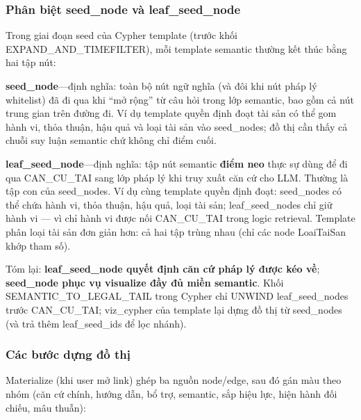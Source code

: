 \documentclass[../DoAn.tex]{subfiles}
\begin{document}
\subsubsection{Phân biệt seed\_node và leaf\_seed\_node}

Trong giai đoạn seed của Cypher template (trước khối EXPAND\_AND\_TIMEFILTER), mỗi template semantic thường kết thúc bằng hai tập nút:

\textbf{seed\_node}---định nghĩa: toàn bộ nút ngữ nghĩa (và đôi khi nút pháp lý whitelist) đã đi qua khi ``mở rộng'' từ câu hỏi trong lớp semantic, bao gồm cả nút trung gian trên đường đi. Ví dụ template quyền định đoạt tài sản có thể gom hành vi, thỏa thuận, hậu quả và loại tài sản vào seed\_nodes; đồ thị cần thấy cả chuỗi suy luận semantic chứ không chỉ điểm cuối.

\textbf{leaf\_seed\_node}---định nghĩa: tập nút semantic \textbf{điểm neo} thực sự dùng để đi qua CAN\_CU\_TAI sang lớp pháp lý khi truy xuất căn cứ cho LLM. Thường là tập con của seed\_nodes. Ví dụ cùng template quyền định đoạt: seed\_nodes có thể chứa hành vi, thỏa thuận, hậu quả, loại tài sản; leaf\_seed\_nodes chỉ giữ hành vi --- vì chỉ hành vi được nối CAN\_CU\_TAI trong logic retrieval. Template phân loại tài sản đơn giản hơn: cả hai tập trùng nhau (chỉ các node LoaiTaiSan khớp tham số).

Tóm lại: \textbf{leaf\_seed\_node quyết định căn cứ pháp lý được kéo về}; \textbf{seed\_node phục vụ visualize đầy đủ miền semantic}. Khối SEMANTIC\_TO\_LEGAL\_TAIL trong Cypher chỉ UNWIND leaf\_seed\_nodes trước CAN\_CU\_TAI; viz\_cypher của template lại dựng đồ thị từ seed\_nodes (và trả thêm leaf\_seed\_ids để lọc nhánh).

\subsubsection{Các bước dựng đồ thị}

Materialize (khi user mở link) ghép ba nguồn node/edge, sau đó gán màu theo nhóm (căn cứ chính, hướng dẫn, bổ trợ, semantic, sắp hiệu lực, hiện hành đối chiếu, mâu thuẫn):
\end{document}
